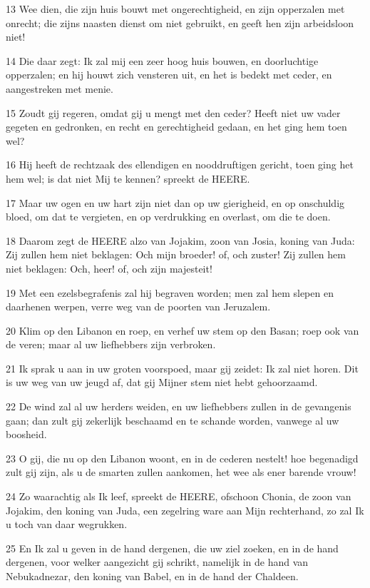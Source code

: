 \par 13 Wee dien, die zijn huis bouwt met ongerechtigheid, en zijn opperzalen met onrecht; die zijns naasten dienst om niet gebruikt, en geeft hen zijn arbeidsloon niet!
\par 14 Die daar zegt: Ik zal mij een zeer hoog huis bouwen, en doorluchtige opperzalen; en hij houwt zich vensteren uit, en het is bedekt met ceder, en aangestreken met menie.
\par 15 Zoudt gij regeren, omdat gij u mengt met den ceder? Heeft niet uw vader gegeten en gedronken, en recht en gerechtigheid gedaan, en het ging hem toen wel?
\par 16 Hij heeft de rechtzaak des ellendigen en nooddruftigen gericht, toen ging het hem wel; is dat niet Mij te kennen? spreekt de HEERE.
\par 17 Maar uw ogen en uw hart zijn niet dan op uw gierigheid, en op onschuldig bloed, om dat te vergieten, en op verdrukking en overlast, om die te doen.
\par 18 Daarom zegt de HEERE alzo van Jojakim, zoon van Josia, koning van Juda: Zij zullen hem niet beklagen: Och mijn broeder! of, och zuster! Zij zullen hem niet beklagen: Och, heer! of, och zijn majesteit!
\par 19 Met een ezelsbegrafenis zal hij begraven worden; men zal hem slepen en daarhenen werpen, verre weg van de poorten van Jeruzalem.
\par 20 Klim op den Libanon en roep, en verhef uw stem op den Basan; roep ook van de veren; maar al uw liefhebbers zijn verbroken.
\par 21 Ik sprak u aan in uw groten voorspoed, maar gij zeidet: Ik zal niet horen. Dit is uw weg van uw jeugd af, dat gij Mijner stem niet hebt gehoorzaamd.
\par 22 De wind zal al uw herders weiden, en uw liefhebbers zullen in de gevangenis gaan; dan zult gij zekerlijk beschaamd en te schande worden, vanwege al uw boosheid.
\par 23 O gij, die nu op den Libanon woont, en in de cederen nestelt! hoe begenadigd zult gij zijn, als u de smarten zullen aankomen, het wee als ener barende vrouw!
\par 24 Zo waarachtig als Ik leef, spreekt de HEERE, ofschoon Chonia, de zoon van Jojakim, den koning van Juda, een zegelring ware aan Mijn rechterhand, zo zal Ik u toch van daar wegrukken.
\par 25 En Ik zal u geven in de hand dergenen, die uw ziel zoeken, en in de hand dergenen, voor welker aangezicht gij schrikt, namelijk in de hand van Nebukadnezar, den koning van Babel, en in de hand der Chaldeen.

